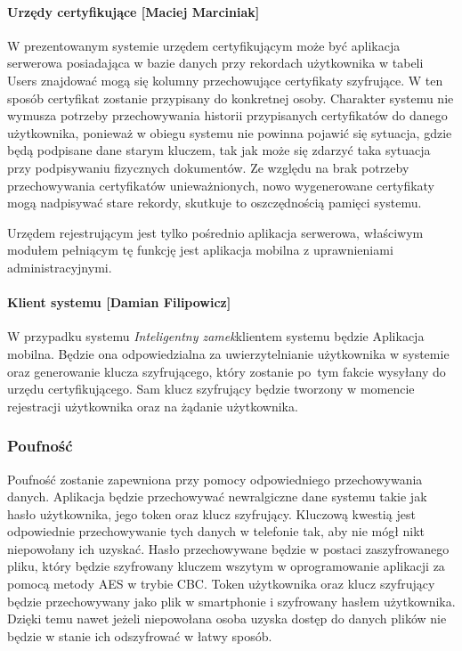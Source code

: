 \documentclass[twoside,10pt]{article}
\def\NazwaSys {\textit{Inteligentny zamek}}
\begin{document}
\paragraph*{Urzędy certyfikujące [Maciej Marciniak]}
W prezentowanym systemie urzędem certyfikującym może być aplikacja serwerowa posiadająca w bazie danych przy rekordach użytkownika w tabeli Users znajdować mogą się kolumny przechowujące certyfikaty szyfrujące. W ten sposób certyfikat zostanie przypisany do konkretnej osoby. Charakter systemu nie wymusza potrzeby przechowywania historii przypisanych certyfikatów do danego użytkownika, ponieważ w obiegu systemu nie powinna pojawić się sytuacja, gdzie będą podpisane dane starym kluczem, tak jak może się zdarzyć taka sytuacja przy podpisywaniu fizycznych dokumentów. Ze względu na brak potrzeby przechowywania certyfikatów unieważnionych, nowo wygenerowane certyfikaty mogą nadpisywać stare rekordy, skutkuje to oszczędnością pamięci systemu. 

Urzędem rejestrującym jest tylko pośrednio aplikacja serwerowa, właściwym modułem pełniącym tę funkcję jest aplikacja mobilna z uprawnieniami administracyjnymi.
\paragraph*{Klient systemu [Damian Filipowicz]}
W przypadku systemu \NazwaSys \space klientem systemu będzie Aplikacja mobilna. Będzie ona odpowiedzialna za uwierzytelnianie użytkownika w systemie oraz generowanie klucza szyfrującego, który zostanie po~tym fakcie wysyłany do urzędu certyfikującego. Sam klucz szyfrujący będzie tworzony w momencie rejestracji użytkownika oraz na żądanie użytkownika\cite{PKI}.

\subsubsection{Poufność}
Poufność zostanie zapewniona przy pomocy odpowiedniego przechowywania danych. Aplikacja będzie przechowywać newralgiczne dane systemu takie jak hasło użytkownika, jego token oraz klucz szyfrujący. Kluczową kwestią jest odpowiednie przechowywanie tych danych w telefonie tak, aby nie mógł nikt niepowołany ich uzyskać. Hasło przechowywane będzie w postaci zaszyfrowanego pliku, który będzie szyfrowany kluczem wszytym w oprogramowanie aplikacji za pomocą metody AES w trybie CBC. Token użytkownika oraz klucz szyfrujący będzie przechowywany jako plik w smartphonie i szyfrowany hasłem użytkownika. Dzięki temu nawet jeżeli niepowołana osoba uzyska dostęp do danych plików nie będzie w stanie ich odszyfrować w łatwy sposób.
\end{document}
